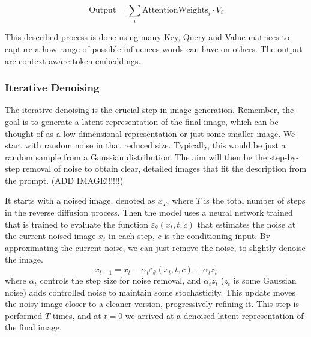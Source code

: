 \documentclass[11pt]{article}
\begin{document}
$$\mathrm{Output} = \sum_i \mathrm{Attention Weights}_i \cdot V_i$$

This described process is done using many Key, Query and Value matrices to capture a how range of possible influences words can have on others. The output are context aware token embeddings.
\fi

\subsubsection{Iterative Denoising}
The iterative denoising is the crucial step in image generation. Remember, the goal is to generate a latent representation of the final image, which can be thought of as a low-dimensional representation or just some smaller image. We start with random noise in that reduced size. Typically, this would be just a random sample from a Gaussian distribution. The aim will then be the step-by-step removal of noise to obtain clear, detailed images that fit the description from the prompt. (ADD IMAGE!!!!!!)

It starts with a noised image, denoted as $x_T$, where $T$ is the total number of steps in the reverse diffusion process. Then the model uses a neural network trained that is trained to evaluate the function $\varepsilon_\theta(x_t,t,c)$ that estimates the noise at the current noised image $x_t$ in each step, $c$ is the conditioning input. By approximating the current noise, we can just remove the noise, to slightly denoise the image.
$$x_{t-1}=x_t-\alpha_t \varepsilon_\theta(x_t,t,c)+ \alpha_t z_t$$
where $\alpha_t$ controls the step size for noise removal, and $\alpha_t z_t$  ($z_t$ is some Gaussian noise) adds controlled noise to maintain some stochasticity. This update moves the noisy image closer to a cleaner version, progressively refining it. This step is performed $T$-times, and at $t=0$ we arrived at a denoised latent representation of the final image.
\end{document}

